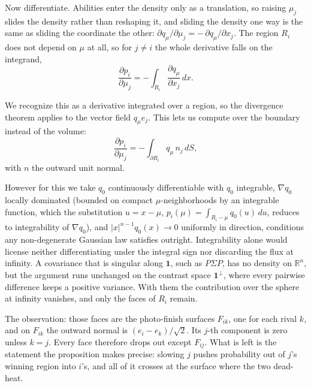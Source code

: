 \documentclass[11pt]{article}
\newcommand{\R}{\mathbb{R}}
\begin{document}
Now differentiate. Abilities enter the density only as a translation, so
raising $\mu_j$ slides the density rather than reshaping it, and sliding
the density one way is the same as sliding the coordinate the other:
$\partial q_\mu/\partial\mu_j=-\,\partial q_\mu/\partial x_j$. The region
$R_i$ does not depend on $\mu$ at all, so for $j\ne i$ the whole
derivative falls on the integrand,
\[
  \frac{\partial p_i}{\partial\mu_j}
   =-\int_{R_i}\frac{\partial q_\mu}{\partial x_j}\,dx .
\]

We recognize this as a derivative integrated over a region, so the
divergence theorem applies to the vector field $q_\mu e_j$. This lets us
compute over the boundary instead of the volume:
\[
  \frac{\partial p_i}{\partial\mu_j}
   =-\int_{\partial R_i}q_\mu\,n_j\,dS ,
\]
with $n$ the outward unit normal.

However for this we take $q_0$ continuously differentiable with $q_0$
integrable, $\nabla q_0$ locally dominated (bounded on compact
$\mu$-neighborhoods by an integrable function, which the substitution
$u=x-\mu$, $p_i(\mu)=\int_{R_i-\mu}q_0(u)\,du$, reduces to integrability
of $\nabla q_0$), and $|x|^{n-1}q_0(x)\to0$ uniformly in direction,
conditions any non-degenerate Gaussian law satisfies outright.
Integrability alone would
license neither differentiating under the integral sign nor discarding
the flux at infinity. A covariance that is singular along $\mathbf{1}$,
such as $P\Sigma P$, has no density on $\R^n$, but the argument runs
unchanged on the contrast space $\mathbf{1}^{\perp}$, where every pairwise
difference keeps a positive variance. With them the contribution over the sphere at
infinity vanishes, and only the faces of $R_i$ remain.

The observation: those faces are the photo-finish surfaces $F_{ik}$, one
for each rival $k$, and on $F_{ik}$ the outward normal is
$(e_i-e_k)/\sqrt2$. Its $j$-th component is zero unless $k=j$. Every face
therefore drops out except $F_{ij}$. What is left is the statement the
proposition makes precise: slowing $j$ pushes probability out of $j$'s
winning region into $i$'s, and all of it crosses at the surface where the
two dead-heat.
\end{document}
